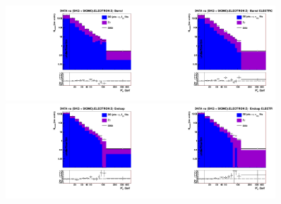 \begin{figure}[htb]
  \begin{center}
   \includegraphics[width=0.45\textwidth]{../figs/figs_v11/ELECTRON_ZGamma/PrepareYields/c_DATAvsBkgPlusSigMCc_ELECTRON_ZGamma_TEMPL_CHISO_UNblind__Barrel__phoEt.pdf}\includegraphics[width=0.45\textwidth]{../figs/figs_v11/ELECTRON_ZGamma/PrepareYields/c_DATAvsBkgPlusSigMCc_ELECTRON_ZGamma_TEMPL_SIHIH_UNblind__Barrel__phoEt.pdf}  \\
   \includegraphics[width=0.45\textwidth]{../figs/figs_v11/ELECTRON_ZGamma/PrepareYields/c_DATAvsBkgPlusSigMCc_ELECTRON_ZGamma_TEMPL_CHISO_UNblind__Endcap__phoEt.pdf}\includegraphics[width=0.45\textwidth]{../figs/figs_v11/ELECTRON_ZGamma/PrepareYields/c_DATAvsBkgPlusSigMCc_ELECTRON_ZGamma_TEMPL_SIHIH_UNblind__Endcap__phoEt.pdf}  \\

\end{center}
\end{figure}
